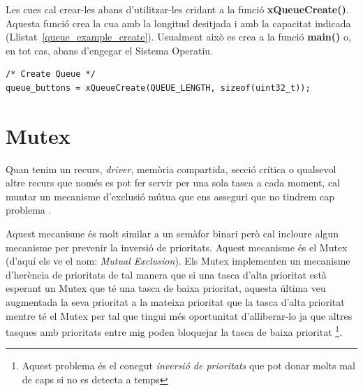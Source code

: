 Les cues cal crear-les abans d'utilitzar-les cridant a la funció {\bf xQueueCreate()}. Aquesta funció crea la cua amb la longitud desitjada i amb la capacitat indicada (Llistat~\ref{queue_example_create}).
Usualment això es crea a la funció {\bf main()} o, en tot cas, abans d'engegar el Sistema Operatiu.

\begin{lstlisting}[style=customc, label=queue_example_create, caption=Creació d'una cua]
/* Create Queue */
queue_buttons = xQueueCreate(QUEUE_LENGTH, sizeof(uint32_t));
\end{lstlisting}

%
%
%

\section{Mutex}
\label{sec:Mutex}
Quan tenim un recurs, {\em driver}, memòria compartida, secció crítica o qualsevol altre recurs que només es pot fer servir per una sola tasca a cada moment, cal muntar un mecanisme d'exclusió mútua que ens asseguri que no tindrem cap problema \cite[244]{FreeRTOSBook}.

Aquest mecanisme és molt similar a un semàfor binari però cal incloure algun mecanisme per prevenir la inversió de prioritats. Aquest mecanisme és el Mutex (d'aquí els ve el nom: {\em Mutual Exclusion}). Els Mutex implementen un mecanisme d'herència de prioritats de tal manera que si una tasca d'alta prioritat està esperant un Mutex que té una tasca de baixa prioritat, aquesta última veu augmentada la seva prioritat a la mateixa prioritat que la tasca d'alta prioritat mentre té el Mutex per tal que tingui més oportunitat d'alliberar-lo ja que altres tasques amb prioritats entre mig poden bloquejar la tasca de baixa prioritat \footnote{Aquest problema és el conegut {\em inversió de prioritats} que pot donar molts mal de caps si no es detecta a temps}.

